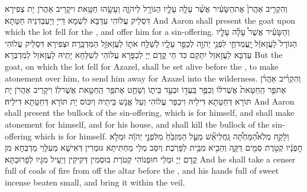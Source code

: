 {וְהִקְרִ֤יב אַהֲרֹן֙ אֶת\maqqaf הַשָּׂעִ֔יר אֲשֶׁ֨ר עָלָ֥ה עָלָ֛יו הַגּוֹרָ֖ל לַיהֹוָ֑ה וְעָשָׂ֖הוּ חַטָּֽאת׃}
{וִיקָרֵיב אַהֲרֹן יָת צְפִירָא דִּסְלֵיק עֲלוֹהִי עַדְבָּא לִשְׁמָא דַּייָ וְיַעְבְּדִנֵּיהּ חַטָּתָא׃}
{And Aaron shall present the goat upon which the lot fell for the \lord, and offer him for a sin-offering.}{}
{וְהַשָּׂעִ֗יר אֲשֶׁר֩ עָלָ֨ה עָלָ֤יו הַגּוֹרָל֙ לַעֲזָאזֵ֔ל יׇֽעֳמַד\maqqaf חַ֛י לִפְנֵ֥י יְהֹוָ֖ה לְכַפֵּ֣ר עָלָ֑יו לְשַׁלַּ֥ח אֹת֛וֹ לַעֲזָאזֵ֖ל הַמִּדְבָּֽרָה׃}
{וּצְפִירָא דִּסְלֵיק עֲלוֹהִי עַדְבָּא לַעֲזָאזֵל יִתָּקַם כִּד חַי קֳדָם יְיָ לְכַפָּרָא עֲלוֹהִי לְשַׁלָּחָא יָתֵיהּ לַעֲזָאזֵל לְמַדְבְּרָא׃}
{But the goat, on which the lot fell for Azazel, shall be set alive before the \lord, to make atonement over him, to send him away for Azazel into the wilderness.}{}
{וְהִקְרִ֨יב אַהֲרֹ֜ן אֶת\maqqaf פַּ֤ר הַֽחַטָּאת֙ אֲשֶׁר\maqqaf ל֔וֹ וְכִפֶּ֥ר בַּֽעֲד֖וֹ וּבְעַ֣ד בֵּית֑וֹ וְשָׁחַ֛ט אֶת\maqqaf פַּ֥ר הַֽחַטָּ֖את אֲשֶׁר\maqqaf לֽוֹ׃}
{וִיקָרֵיב אַהֲרֹן יָת תּוֹרָא דְּחַטָּתָא דִּילֵיהּ וִיכַפַּר עֲלוֹהִי וְעַל אֱנָשׁ בֵּיתֵיהּ וְיִכּוֹס יָת תּוֹרָא דְּחַטָּתָא דִּילֵיהּ׃}
{And Aaron shall present the bullock of the sin-offering, which is for himself, and shall make atonement for himself, and for his house, and shall kill the bullock of the sin-offering which is for himself.}{}
{וְלָקַ֣ח מְלֹֽא\maqqaf הַ֠מַּחְתָּ֠ה גַּֽחֲלֵי\maqqaf אֵ֞שׁ מֵעַ֤ל הַמִּזְבֵּ֙חַ֙ מִלִּפְנֵ֣י יְהֹוָ֔ה וּמְלֹ֣א חׇפְנָ֔יו קְטֹ֥רֶת סַמִּ֖ים דַּקָּ֑ה וְהֵבִ֖יא מִבֵּ֥ית לַפָּרֹֽכֶת׃}
{וְיִסַּב מְלֵי מַחְתִּיתָא גּוּמְרִין דְּאִישָׁא מֵעִלָּוֵי מַדְבְּחָא מִן קֳדָם יְיָ וּמְלֵי חוּפְנוֹהִי קְטֹרֶת בּוּסְמִין דַּקִיקִין וְיַעֵיל מִגָּיו לְפָרוּכְתָּא׃}
{And he shall take a censer full of coals of fire from off the altar before the \lord, and his hands full of sweet incense beaten small, and bring it within the veil.}{}
